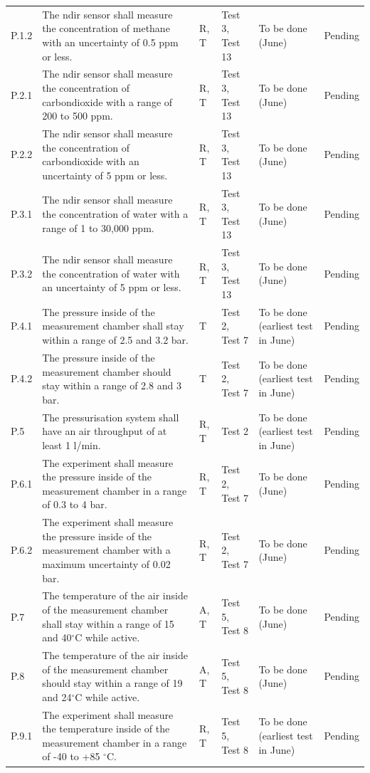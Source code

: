 \documentclass[
  a4paper,
  11pt,
  openany,
  parskip,
  toc=totoc,
  listof=totoc,
  bibliography=totoc
]{scrreprt}
\newcommand{\degree}{\ensuremath{^\circ}} %
\begin{document}
\begin{longtable}{L{0.7cm}L{5cm}L{1.5cm}L{2cm}L{2.5cm}L{2cm}}
P.1.2 & The \gls{ndir} sensor shall measure the concentration of methane with an uncertainty of 0.5 ppm or less. & R, T & Test 3, Test 13 & To be done (June) & Pending\\
P.2.1 & The \gls{ndir} sensor shall measure the concentration of carbondioxide with a range of 200 to 500 ppm. & R, T & Test 3, Test 13  & To be done (June) & Pending \\
P.2.2 & The \gls{ndir} sensor shall measure the concentration of carbondioxide with an uncertainty of 5 ppm or less. & R, T & Test 3, Test 13 & To be done (June) & Pending\\
P.3.1 & The \gls{ndir} sensor shall measure the concentration of water with a range of 1 to 30,000 ppm. & R, T & Test 3, Test 13  & To be done (June) & Pending \\
P.3.2 & The \gls{ndir} sensor shall measure the concentration of water with an uncertainty of 5 ppm or less. & R, T & Test 3, Test 13  & To be done (June) & Pending \\
P.4.1 & The pressure inside of the measurement chamber shall stay within a range of 2.5 and 3.2 bar.  & T & Test 2, Test 7 & To be done (earliest test in June) & Pending \\
P.4.2 & The pressure inside of the measurement chamber should stay within a range of 2.8 and 3 bar. & T & Test 2, Test 7 & To be done (earliest test in June) & Pending \\
P.5 & The pressurisation system shall have an air throughput of at least 1 l/min. & R, T & Test 2 & To be done (earliest test in June) & Pending \\
P.6.1 & The experiment shall measure the pressure inside of the measurement chamber in a range of 0.3 to 4 bar. & R, T & Test 2, Test 7 & To be done (June) & Pending \\
P.6.2 & The experiment shall measure the pressure inside of the measurement chamber with a maximum uncertainty of 0.02 bar. & R, T & Test 2, Test 7 & To be done (June) & Pending \\
P.7 & The temperature of the air inside of the measurement chamber shall stay within a range of 15 and 40\degree C while active. & A, T & Test 5, Test 8 & To be done (June)& Pending\\
P.8 & The temperature of the air inside of the measurement chamber should stay within a range of 19 and 24\degree C while active. & A, T & Test 5, Test 8 & To be done (June)& Pending \\
P.9.1 & The experiment shall measure the temperature inside of the measurement chamber in a range of -40 to +85 \degree C.  & R, T & Test 5, Test 8 & To be done (earliest test in June) & Pending \\

\end{longtable}
\end{document}
